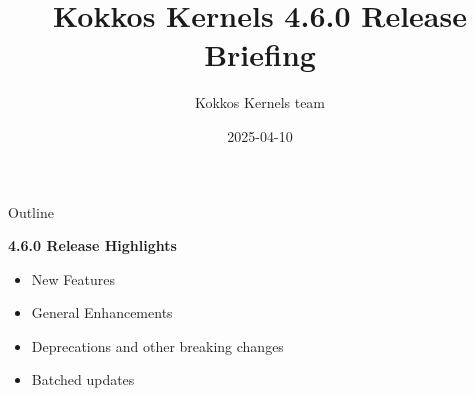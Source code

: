 
\usepackage{tikz}
\graphicspath{{kk_4_5/figures/}}

\def\sandid{SAND2025-04407PE}

\title{Kokkos Kernels 4.6.0 Release Briefing}

\author{Kokkos Kernels team}

\date{2025-04-10}



\shorttrue
\mediumfalse
\fullfalse



\begin{frame}
  \titlepage
\end{frame}


\begin{frame}[fragile]{Outline}

  \textbf{4.6.0 Release Highlights}

  \begin{itemize}
    \item{New Features}
    \item{General Enhancements}
    \item{Deprecations and other breaking changes}
    \item{Batched updates}
  \end{itemize}

\end{frame}

